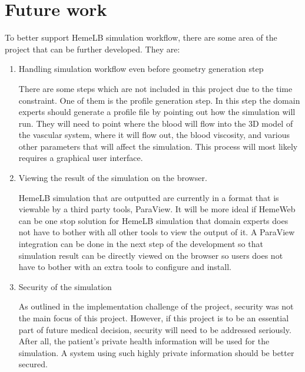  

\chapter[Future work]{Future work}

To better support HemeLB simulation workflow, there are some area of the project that can be further developed. They are:

\begin{enumerate}
	\item Handling simulation workflow even before geometry generation step
	
	There are some steps which are not included in this project due to the time constraint. One of them is the profile generation step. In this step the domain experts should generate a profile file by pointing out how the simulation will run. They will need to point where the blood will flow into the 3D  model of the vascular system, where it will flow out, the blood viscosity, and various other parameters that will affect the simulation. This process will most likely requires a graphical user interface.
	
	\item Viewing the result of the simulation on the browser.
	
	HemeLB simulation that are outputted are currently in a format that is viewable by a third party tools, ParaView. It will be more ideal if HemeWeb can be one stop solution for HemeLB simulation that domain experts does not have to bother with all other tools to view the output of it. A ParaView integration can be done in the next step of the development so that simulation result can be directly viewed on the browser so users does not have to bother with an extra tools to configure and install.
	
	\item Security of the simulation
	
	As outlined in the implementation challenge of the project, security was not the main focus of this project. However, if this project is to be an essential part of future medical decision, security will need to be addressed seriously. After all, the patient's private health information will be used for the simulation. A system using such highly private information should be better secured.
	

\end{enumerate}

